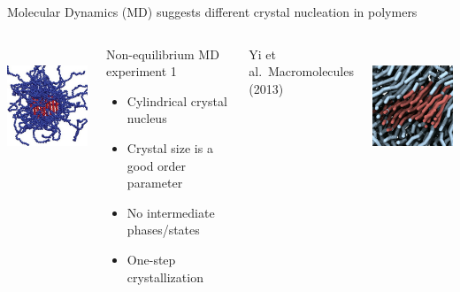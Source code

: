 \documentclass[aspectratio=169]{beamer}
\begin{document}
\begin{frame}[t]{Molecular Dynamics (MD) suggests different crystal nucleation in polymers}
  \vspace{-0.5\baselineskip}

  \begin{columns}[T]


    \centering
    \includegraphics[height=0.5\textwidth]{figs/fig-Rutledge_crystal_crop.pdf}
    \vspace{0.5\baselineskip}

    \begin{block}{Non-equilibrium MD experiment 1}
      \begin{itemize}
        \item Cylindrical crystal nucleus
        \item Crystal size is a good order parameter
        \item No intermediate phases/states
        \item One-step crystallization
      \end{itemize}
    \end{block}

    \vspace{4pt}
    {\small{}Yi et al.~Macromolecules (2013)\par}


    \centering
    \includegraphics[height=0.5\textwidth]{figs/fig-Hall_crystal_crop.pdf}
    \vspace{0.5\baselineskip}


\end{columns}
\end{frame}
\end{document}
